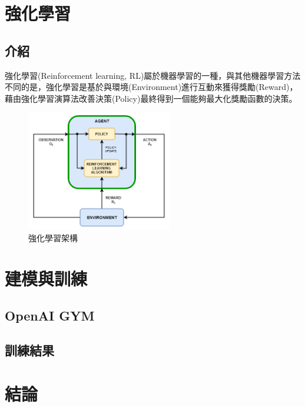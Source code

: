 \documentclass[a4paper, onecolumn, 11pt, AutoFakeBold]{article}
\newcommand{\texttwelve}{\fontsize{12}{12}\selectfont}
\newcommand{\figwidth}{2.5in}
\begin{document}
\begin{multicols*}{2}
\bigskip
\section{強化學習}
\subsection{介紹}
\par
強化學習(Reinforcement learning, RL)屬於機器學習的一種，與其他機器學習方法不同的是，強化學習是基於與環境(Environment)進行互動來獲得獎勵(Reward)，藉由強化學習演算法改善決策(Policy)最終得到一個能夠最大化獎勵函數的決策。
\begin{figure}[H]
    \centering
    \includegraphics[width=\figwidth]{RL_architecture.png}
    \caption{強化學習架構}
    \label{fig:RL_architecture}
\end{figure}

\bigskip
\section{建模與訓練}
\subsection{OpenAI GYM}

\bigskip
\subsection{訓練結果}

\bigskip
\section{結論}

\bigskip
\titleformat{\section}{\bfseries\texttwelve}{\xCJKnumber{\thesection}、}{0em}{}
\printbibliography[title=\texttwelve{參考文獻}]

\end{multicols*}
\end{document}
